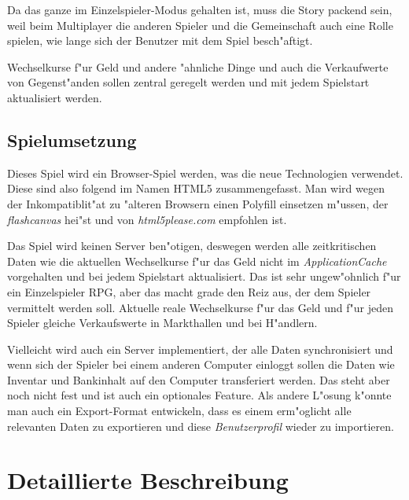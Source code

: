 \documentclass[14pt]{book}
\begin{document}
Da das ganze im Einzelspieler-Modus gehalten ist, muss die Story packend sein, weil beim Multiplayer die anderen Spieler und die Gemeinschaft auch eine Rolle spielen, wie lange sich der Benutzer mit dem Spiel besch"aftigt.

Wechselkurse f"ur Geld und andere "ahnliche Dinge und auch die Verkaufwerte von Gegenst"anden sollen zentral geregelt werden und mit jedem Spielstart aktualisiert werden. 
 

\chapter{Spielumsetzung}

Dieses Spiel wird ein Browser-Spiel werden, was die neue Technologien verwendet. Diese sind also folgend im Namen HTML5 zusammengefasst. Man wird wegen der Inkompatiblit"at zu "alteren Browsern einen Polyfill einsetzen m"ussen, der \emph{flashcanvas} hei"st und von \emph{html5please.com} empfohlen ist.

Das Spiel wird keinen Server ben"otigen, deswegen werden alle  zeitkritischen Daten wie die aktuellen Wechselkurse f"ur das Geld nicht im \emph{ApplicationCache} vorgehalten und bei jedem Spielstart aktualisiert. Das ist sehr ungew"ohnlich f"ur ein Einzelspieler RPG, aber das macht grade den Reiz aus, der dem Spieler vermittelt werden soll. Aktuelle reale Wechselkurse f"ur das Geld und f"ur jeden Spieler gleiche Verkaufswerte in Markthallen und bei H"andlern.

Vielleicht wird auch ein Server implementiert, der alle Daten synchronisiert und wenn sich der Spieler bei einem anderen Computer einloggt sollen die Daten wie Inventar und Bankinhalt auf den Computer transferiert werden. Das steht aber noch nicht fest und ist auch ein optionales Feature. Als andere L"osung k"onnte man auch ein Export-Format entwickeln, dass es einem erm"oglicht alle relevanten Daten zu exportieren und diese \emph{Benutzerprofil} wieder zu importieren.


\part{Detaillierte Beschreibung}
\end{document}
